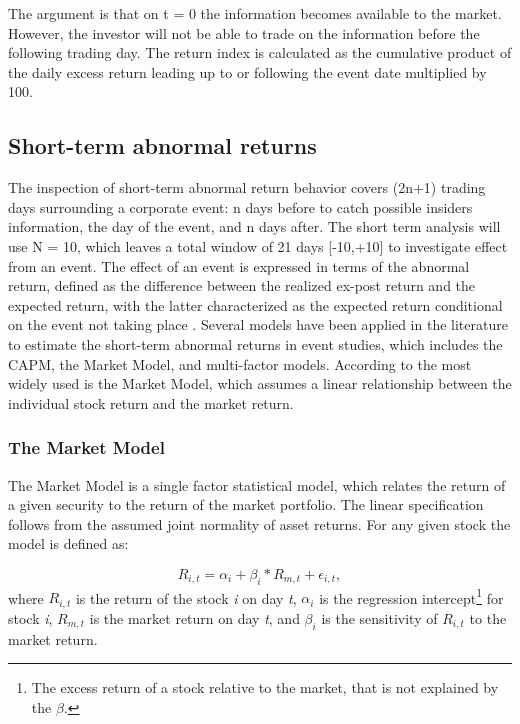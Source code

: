 The argument is that on t = 0 the information becomes available to the market. However, the investor will not be able to trade on the information before the following trading day. The return index is calculated as the 
cumulative product of the daily excess return leading up to or following the event date multiplied by 100. 

\subsection{Short-term abnormal returns}

The inspection of short-term abnormal return behavior covers (2n+1) trading days surrounding a corporate event: n days before to catch possible insiders information, the day of the event, and n days after. The short term analysis will use N = 10, which leaves a total window of 21 days [-10,+10] to investigate effect from an event. The effect of an event is expressed in terms of the abnormal return, defined as the difference between the realized ex-post return and the expected return, with the latter characterized as the expected return conditional on the event not taking place \citep{Event_studies}. Several models have been applied in the literature to estimate the short-term abnormal returns in event studies, which includes the CAPM, the Market Model, and multi-factor models. According to \cite{holler2014event} the most widely used is the Market Model, which assumes a linear relationship between the individual stock return and the market return. 

\subsubsection{The Market Model}

The Market Model is a single factor statistical model, which relates the return of a given security to the return of the market portfolio. The linear specification follows from the assumed joint normality of asset returns. For any given stock the model is defined as:

\begin{equation} \label{market_model}
    R_{i,t} = \alpha_i + \beta_i * R_{m,t} + \epsilon_{i,t},
\end{equation}
 where $R_{i,t}$ is the return of the stock \textit{i} on day \textit{t}, $\alpha_i$ is the regression intercept\footnote{The excess return of a stock relative to the market, that is not explained by the $\beta$.} for stock \textit{i}, $R_{m,t}$ is the market return on day \textit{t}, and
 $\beta_i$ is the sensitivity of $R_{i,t}$ to the market return.  

